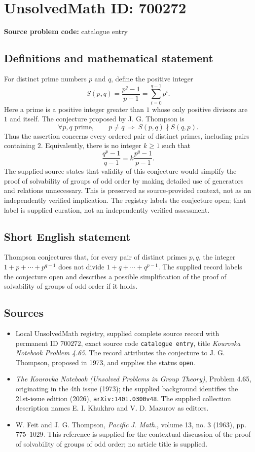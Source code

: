\documentclass[11pt]{article}
\begin{document}
\section*{UnsolvedMath ID: 700272}
\textbf{Source problem code:} catalogue entry
\subsection{Definitions and mathematical statement}
For distinct prime numbers \(p\) and \(q\), define the positive integer
\[
S(p,q)=\frac{p^q-1}{p-1}=\sum_{i=0}^{q-1}p^i.
\]
Here a prime is a positive integer greater than \(1\) whose only positive divisors are \(1\) and itself. The conjecture proposed by J. G. Thompson is
\[
\forall p,q\text{ prime},\qquad p\ne q\ \Longrightarrow\ S(p,q)\nmid S(q,p).
\]
Thus the assertion concerns every ordered pair of distinct primes, including pairs containing \(2\). Equivalently, there is no integer \(k\geq 1\) such that
\[
\frac{q^p-1}{q-1}=k\frac{p^q-1}{p-1}.
\]
The supplied source states that validity of this conjecture would simplify the proof of solvability of groups of odd order by making detailed use of generators and relations unnecessary. This is preserved as source-provided context, not as an independently verified implication. The registry labels the conjecture open; that label is supplied curation, not an independently verified assessment.
\subsection{Short English statement}
Thompson conjectures that, for every pair of distinct primes \(p,q\), the integer \(1+p+\cdots+p^{q-1}\) does not divide \(1+q+\cdots+q^{p-1}\). The supplied record labels the conjecture open and describes a possible simplification of the proof of solvability of groups of odd order if it holds.
\subsection{Sources}
\begin{itemize}
\item Local UnsolvedMath registry, supplied complete source record with permanent ID \(700272\), exact source code \texttt{catalogue entry}, title \emph{Kourovka Notebook Problem 4.65}. The record attributes the conjecture to J. G. Thompson, proposed in 1973, and supplies the status \texttt{open}.
\item \emph{The Kourovka Notebook (Unsolved Problems in Group Theory)}, Problem 4.65, originating in the 4th issue (1973); the supplied background identifies the 21st-issue edition (2026), \texttt{arXiv:1401.0300v48}. The supplied collection description names E. I. Khukhro and V. D. Mazurov as editors.
\item W. Feit and J. G. Thompson, \emph{Pacific J. Math.}, volume 13, no. 3 (1963), pp. 775--1029. This reference is supplied for the contextual discussion of the proof of solvability of groups of odd order; no article title is supplied.
\end{itemize}
\end{document}
